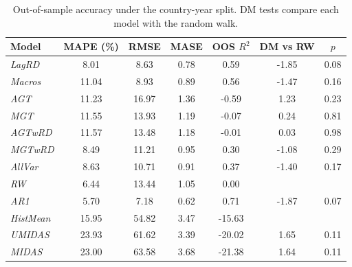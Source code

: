 \begin{table}[!htb]
\centering
\caption{Out-of-sample accuracy under the country-year split. DM tests compare each model with the random walk.}
\label{tab:cy_benchmarks}
\begin{tabular}{l c c c c c c}
\toprule
Model & MAPE (\%) & RMSE & MASE & OOS $R^2$ & DM vs RW & $p$ \\
\midrule
\textit{LagRD} & 8.01 & 8.63 & 0.78 & 0.59 & -1.85 & 0.08 \\
\textit{Macros} & 11.04 & 8.93 & 0.89 & 0.56 & -1.47 & 0.16 \\
\textit{AGT} & 11.23 & 16.97 & 1.36 & -0.59 & 1.23 & 0.23 \\
\textit{MGT} & 11.55 & 13.93 & 1.19 & -0.07 & 0.24 & 0.81 \\
\textit{AGTwRD} & 11.57 & 13.48 & 1.18 & -0.01 & 0.03 & 0.98 \\
\textit{MGTwRD} & 8.49 & 11.21 & 0.95 & 0.30 & -1.08 & 0.29 \\
\textit{AllVar} & 8.63 & 10.71 & 0.91 & 0.37 & -1.40 & 0.17 \\
\midrule
\textit{RW} & 6.44 & 13.44 & 1.05 & 0.00 &  &  \\
\textit{AR1} & 5.70 & 7.18 & 0.62 & 0.71 & -1.87 & 0.07 \\
\textit{HistMean} & 15.95 & 54.82 & 3.47 & -15.63 &  &  \\
\textit{UMIDAS} & 23.93 & 61.62 & 3.39 & -20.02 & 1.65 & 0.11 \\
\textit{MIDAS} & 23.00 & 63.58 & 3.68 & -21.38 & 1.64 & 0.11 \\
\bottomrule
\end{tabular}
\end{table}
